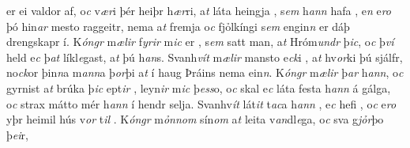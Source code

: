 er ei valdor af, o\textit{c} v\textit{ær}i þér heiþr h\textit{ær}ri,
a\textit{t} láta heingja  , s\textit{em} h\textit{ann} hafa  , e\textit{n} e\textit{ro} þó hin\textit{ar} mesto  raggeitr,
nema a\textit{t} fremja   o\textit{c} fjỏlkíngi  s\textit{em} engin\textit{n} er dáþ   drengskapr í. K\textit{óngr} m\textit{ælir} f\textit{yrir} m\textit{ic}
er  , s\textit{em} satt man, 
a\textit{t} Hróm\textit{undr}  þ\textit{ic}, 
o\textit{c} þ\textit{ví} held e\textit{c} þ\textit{at}
líkl\textit{e}gast, a\textit{t} þú   h\textit{an}s. Svanh\textit{vít} m\textit{ælir} mansto e\textit{ck}i  , a\textit{t} hv\textit{or}ki þú sjálfr,   no\textit{ck}or   þin\textit{n}a m\textit{ann}a þ\textit{or}þi  a\textit{t}  í haug Þráins nema   ein\textit{n}. 
K\textit{óngr} m\textit{ælir} þ\textit{ar}    h\textit{ann}, o\textit{c} gyrnist a\textit{t}  brúka   þ\textit{ic} ept\textit{ir}  ,   leyn\textit{ir} m\textit{ic} þ\textit{ess}o, o\textit{c}  skal e\textit{c} láta festa  h\textit{ann} á  gálga, 
o\textit{c} strax mátto mér
h\textit{ann} í hendr selja. Svanhv\textit{ít}  
lát\textit{it}  t\textit{ac}a h\textit{ann} , 
e\textit{c} hefi   , o\textit{c} e\textit{ro} yþr heimil hús v\textit{or} t\textit{il}
. 
K\textit{óngr}  m\textit{ỏnnom} sín\textit{om} a\textit{t} leita
v\textit{an}dl\textit{e}ga, o\textit{c} sva g\textit{jỏr}þo þ\textit{ei}r,
